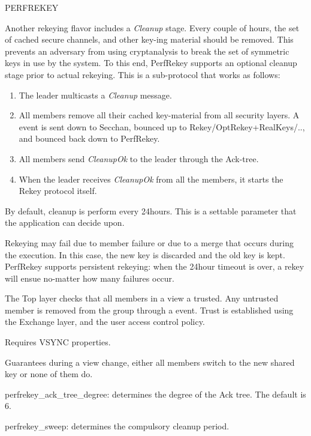 \begin{Layer}{PERFREKEY}
\begin{Protocol}
Another rekeying flavor includes a {\it Cleanup} stage. Every couple
of hours, the set of cached secure channels, and other key-ing
material should be removed. This prevents an adversary from using
cryptanalysis to break the set of symmetric keys in use by the
system. To this end, PerfRekey supports an optional cleanup stage
prior to actual rekeying.  This is a sub-protocol that works as follows:
\begin{enumerate}
\item The leader multicasts a {\it Cleanup} message.
\item All members remove all their cached key-material from all
security layers. A  event is sent down to
Secchan, bounced up to Rekey/OptRekey+RealKeys/.., and bounced back down
to PerfRekey.
\item All members send {\it CleanupOk} to the leader through the Ack-tree.
\item When the leader receives {\it CleanupOk} from all the members, it starts
the Rekey protocol itself.
\end{enumerate}

By default, cleanup is perform every 24hours. This is a settable
parameter that the application can decide upon. 

Rekeying may fail due to member failure or due to a merge that
occurs during the execution. In this case, the new key is discarded
and the old key is kept. PerfRekey supports persistent rekeying: when
the 24hour timeout is over, a rekey will ensue no-matter how many
failures occur. 

The Top layer checks that all members in a view a trusted. Any
untrusted member is removed from the group through a 
event. Trust is established using the Exchange layer, and the user
access control policy.
\end{Protocol}

\begin{Properties}
\item Requires VSYNC properties.
\item
Guarantees during a view change, either all members switch to the new
shared key or none of them do.
\end{Properties}

\begin{Parameters}
\item {perfrekey\_ack\_tree\_degree:} determines the degree of the Ack
tree. The default is 6.
\item {perfrekey\_sweep:} determines the compulsory cleanup period. 
\end{Parameters}


\end{Layer}
